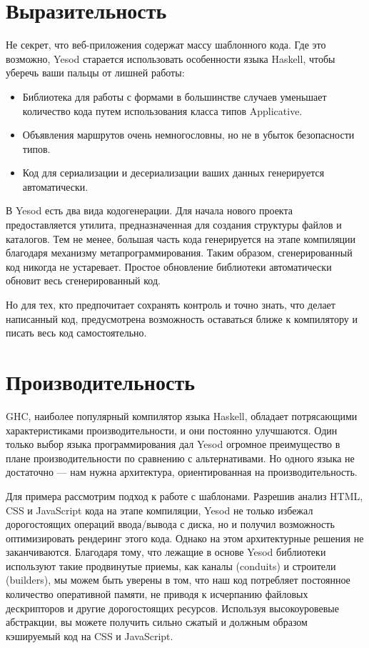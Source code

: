 \section{Выразительность}

Не секрет, что веб-приложения содержат массу шаблонного кода. Где это возможно, Yesod старается использовать особенности языка Haskell, чтобы уберечь ваши пальцы от лишней работы:

\begin{itemize}
  \item Библиотека для работы с формами в большинстве случаев уменьшает количество кода путем использования класса типов Applicative.
  \item Объявления маршрутов очень немногословны, но не в убыток безопасности типов.
  \item Код для сериализации и десериализации ваших данных генерируется автоматически.
\end{itemize}

В Yesod есть два вида кодогенерации. Для начала нового проекта предоставляется утилита, предназначенная для создания структуры файлов и каталогов. Тем не менее, большая часть кода генерируется на этапе компиляции благодаря механизму метапрограммирования. Таким образом, сгенерированный код никогда не устаревает. Простое обновление библиотеки автоматически обновит весь сгенерированный код.

Но для тех, кто предпочитает сохранять контроль и точно знать, что делает написанный код, предусмотрена возможность оставаться ближе к компилятору и писать весь код самостоятельно.

\section{Производительность}

GHC, наиболее популярный компилятор языка Haskell, обладает потрясающими характеристиками производительности, и они постоянно улучшаются. Один только выбор языка программирования дал Yesod огромное преимущество в плане производительности по сравнению с альтернативами. Но одного языка не достаточно --- нам нужна архитектура, ориентированная на производительность.

Для примера рассмотрим подход к работе с шаблонами. Разрешив анализ HTML, CSS и JavaScript кода на этапе компиляции, Yesod не только избежал дорогостоящих операций ввода/вывода с диска, но и получил возможность оптимизировать рендеринг этого кода. Однако на этом архитектурные решения не заканчиваются. Благодаря тому, что лежащие в основе Yesod библиотеки используют такие продвинутые приемы, как каналы (conduits) и строители (builders), мы можем быть уверены в том, что наш код потребляет постоянное количество оперативной памяти, не приводя к исчерпанию файловых дескрипторов и другие дорогостоящих ресурсов. Используя высокоуровевые абстракции, вы можете получить сильно сжатый и должным образом кэшируемый код на CSS и JavaScript.

